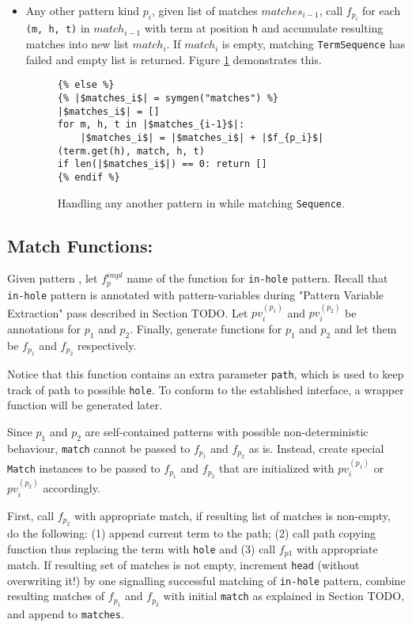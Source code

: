 \begin{itemize}
\item Any other pattern kind $p_i$, given list of matches $matches_{i-1}$, call $f_{p_i}$ for each \texttt{(m, h, t)} in $match_{i-1}$ with term at position \texttt{h} and accumulate resulting matches into new list $match_{i}$. If $match_{i}$ is empty, matching \texttt{TermSequence} has failed and empty list is returned. Figure \ref{codegen-pattern-seq-3} demonstrates this.

\begin{figure}[htb]
\begin{verbatim}
{% else %}
{% |$matches_i$| = symgen("matches") %}
|$matches_i$| = []
for m, h, t in |$matches_{i-1}$|:
	|$matches_i$| = |$matches_i$| + |$f_{p_i}$|(term.get(h), match, h, t)
if len(|$matches_i$|) == 0: return []
{% endif %}
\end{verbatim}
\caption{Handling any another pattern in \PatternSequenceNoArg \space while matching \texttt{Sequence}.}
\label{codegen-pattern-seq-3}
\end{figure}
\end{itemize}

\subsection{Match Functions: \PatternInHoleNoArg}
Given pattern \PatternInHole, let $f_p^{impl}$ name of the function for \texttt{in-hole} pattern. Recall that \texttt{in-hole} pattern is annotated with pattern-variables during "Pattern Variable Extraction" pass described in Section TODO. Let $pv_i^{(p_1)}$ and $pv_i^{(p_2)}$ be annotations for $p_1$ and $p_2$. Finally, generate functions for $p_1$ and $p_2$ and let them be $f_{p_1}$ and $f_{p_2}$ respectively. 

Notice that this function contains an extra parameter \texttt{path}, which is used to keep track of path to possible \texttt{hole}. To conform to the established interface, a wrapper function will be generated later.

Since $p_1$ and $p_2$ are self-contained patterns with possible non-deterministic behaviour, \texttt{match} cannot be passed to $f_{p_1}$ and $f_{p_2}$ as is. Instead, create special \texttt{Match} instances to be passed to $f_{p_1}$ and $f_{p_2}$ that are initialized with $pv_i^{(p_1)}$ or $pv_i^{(p_2)}$ accordingly.

First, call $f_{p_2}$ with appropriate match, if resulting list of matches is non-empty, do the following: (1) append current term to the path; (2) call path copying function thus replacing the term with \texttt{hole} and (3) call $f_{p1}$ with appropriate match. If resulting set of matches is not empty, increment \texttt{head} (without overwriting it!) by one signalling successful matching of \texttt{in-hole} pattern, combine resulting matches of $f_{p_1}$ and $f_{p_2}$ with initial \texttt{match} as explained in Section TODO, and append to \texttt{matches}.

